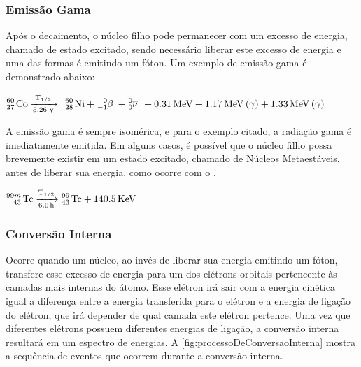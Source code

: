 \documentclass[11pt,a4paper]{article}
\newcounter{exemplo}
\begin{document}
            \subsubsection{Emissão Gama}

                Após o decaimento, o núcleo filho pode permanecer com um excesso de energia, chamado de estado excitado, sendo necessário liberar este excesso de energia e uma das formas é emitindo um fóton. Um exemplo de emissão gama é demonstrado abaixo:

                \begin{center}
                    $\ce{^{60}_{27} Co  ->[{T_{1/2}}][{5.26 y}] \; ^{60}_{28} Ni + ^{0}_{-1}\beta \; + ^{0}_{0}\overline{\nu} \; + 0.31 MeV + 1.17 MeV (\gamma) + 1.33 MeV (\gamma)}$
                \end{center}
                
                A emissão gama é sempre isomérica, e para o exemplo citado, a radiação gama é imediatamente emitida. Em alguns casos, é possível que o núcleo filho possa brevemente existir em um estado excitado, chamado de Núcleos Metaestáveis, antes de liberar sua energia, como ocorre com o .

                \begin{center}
                    $\ce{^{99m}_{43} Tc ->[{T_{1/2}}][6.0 h] ^{99}_{43} Tc + 140.5 KeV}$
                \end{center}
            
            \subsubsection{Conversão Interna}

                
                Ocorre quando um núcleo, ao invés de liberar sua energia emitindo um fóton, transfere esse excesso de energia para um dos elétrons orbitais pertencente às camadas mais internas do átomo.  Esse elétron irá sair com a energia cinética igual a diferença entre a energia transferida para o elétron e a energia de ligação do elétron, que irá depender de qual camada este elétron pertence. Uma vez que diferentes elétrons possuem diferentes energias de ligação, a conversão interna resultará em um espectro de energias. A \ref{fig:processoDeConversaoInterna} mostra a sequência de eventos que ocorrem durante a conversão interna.
\end{document}
